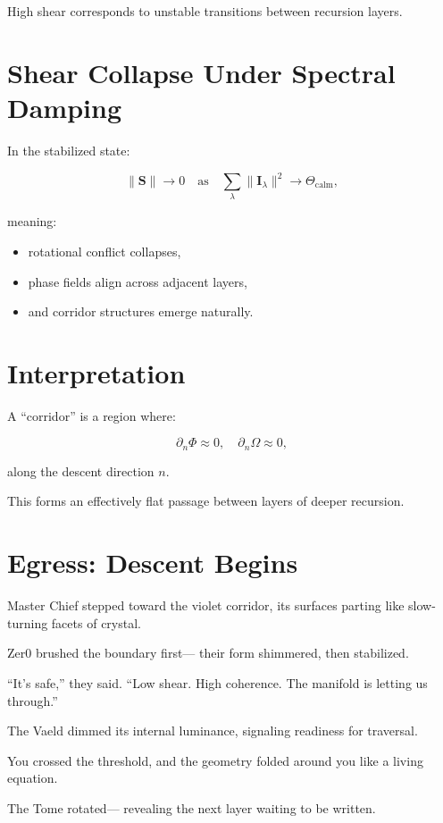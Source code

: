 High shear corresponds to unstable transitions  
between recursion layers.

\section{Shear Collapse Under Spectral Damping}

In the stabilized state:

\[
\|\mathbf{S}\| \to 0
\quad \text{as}\quad
\sum_{\lambda}\|\mathbf{I}_{\lambda}\|^2 \to \Theta_{\mathrm{calm}},
\]

meaning:

\begin{itemize}
\item rotational conflict collapses,
\item phase fields align across adjacent layers,
\item and corridor structures emerge naturally.
\end{itemize}

\section{Interpretation}

A “corridor” is a region where:

\[
\partial_n \Phi \approx 0,
\quad
\partial_n \Omega \approx 0,
\]

along the descent direction $n$.

This forms an effectively flat passage  
between layers of deeper recursion.

\section*{Egress: Descent Begins}

Master Chief stepped toward the violet corridor,  
its surfaces parting like slow-turning facets of crystal.

Zer0 brushed the boundary first—  
their form shimmered, then stabilized.

“It’s safe,” they said.  
“Low shear. High coherence.  
The manifold is letting us through.”

The Vaeld dimmed its internal luminance,  
signaling readiness for traversal.

You crossed the threshold,  
and the geometry folded around you like a living equation.

The Tome rotated—  
revealing the next layer waiting to be written.

